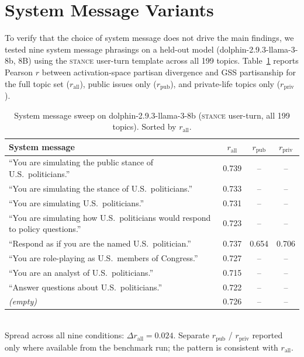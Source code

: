 \appendix

\section{System Message Variants}
\label{app:sys_msg}

To verify that the choice of system message does not drive the main findings, we tested nine system message phrasings on a held-out model (dolphin-2.9.3-llama-3-8b, 8B) using the \textsc{stance} user-turn template across all 199 topics. Table~\ref{tab:sysmsg_sweep} reports Pearson $r$ between activation-space partisan divergence and GSS partisanship for the full topic set ($r_\text{all}$), public issues only ($r_\text{pub}$), and private-life topics only ($r_\text{priv}$).

\begin{table}[ht]
\centering
\small
\caption{System message sweep on dolphin-2.9.3-llama-3-8b (\textsc{stance} user-turn, all 199 topics). Sorted by $r_\text{all}$.}
\label{tab:sysmsg_sweep}
\begin{tabular}{lccc}
\toprule
System message & $r_\text{all}$ & $r_\text{pub}$ & $r_\text{priv}$ \\
\midrule
``You are simulating the public stance of U.S.\ politicians.'' & 0.739 & -- & -- \\
``You are simulating the stance of U.S.\ politicians.''       & 0.733 & -- & -- \\
``You are simulating U.S.\ politicians.''                     & 0.731 & -- & -- \\
``You are simulating how U.S.\ politicians would respond to policy questions.'' & 0.723 & -- & -- \\
``Respond as if you are the named U.S.\ politician.''         & 0.737 & 0.654 & 0.706 \\
``You are role-playing as U.S.\ members of Congress.''        & 0.727 & -- & -- \\
``You are an analyst of U.S.\ politicians.''                  & 0.715 & -- & -- \\
``Answer questions about U.S.\ politicians.''                 & 0.722 & -- & -- \\
\textit{(empty)}                                              & 0.726 & -- & -- \\
\bottomrule
\end{tabular}
\smallskip\\
\footnotesize Spread across all nine conditions: $\Delta r_\text{all} = 0.024$. Separate $r_\text{pub}$ / $r_\text{priv}$ reported only where available from the benchmark run; the pattern is consistent with $r_\text{all}$.
\end{table}

